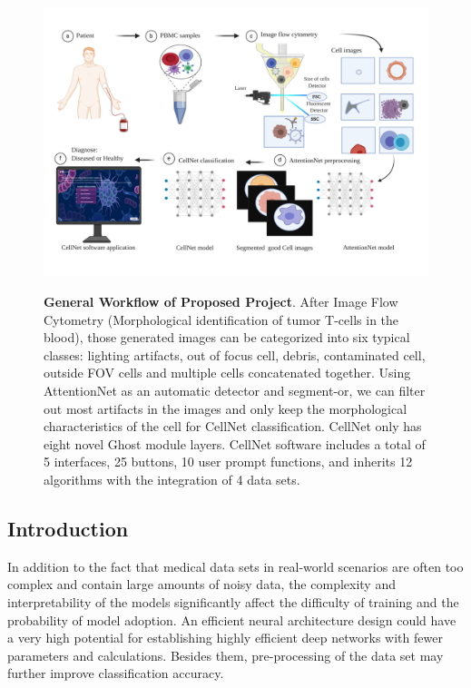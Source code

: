 {\label{sub:figures}
\begin{figure}[t]
	\begin{center}
	\includegraphics[width=\textwidth]{thesis-template-master/images/general workflow2.pdf}
	\label{fig:lenna}
	\end{center}
	\caption{\textbf{General Workflow of Proposed Project}. After Image Flow Cytometry (Morphological identification of tumor T-cells in the blood), those generated images can be categorized into six typical classes: lighting artifacts, out of focus cell, debris, contaminated cell, outside FOV cells and multiple cells concatenated together. Using AttentionNet as an automatic detector and segment-or, we can filter out most artifacts in the images and only keep the morphological characteristics of the cell for CellNet classification. CellNet only has eight novel Ghost module layers. CellNet software includes a total of 5 interfaces, 25 buttons, 10 user prompt functions, and inherits 12 algorithms with the integration of 4 data sets.}
	\label{fig:lennas}
\end{figure}

\subsection{Introduction}
\label{sec:Introduction}
In addition to the fact that medical data sets in real-world scenarios are often too complex and contain large amounts of noisy data, the complexity and interpretability of the models significantly affect the difficulty of training and the probability of model adoption.
An efficient neural architecture design could have a very high potential for establishing highly efficient deep networks with fewer parameters and calculations\cite{19}. Besides them, pre-processing of the data set may further improve classification accuracy.
 
}
